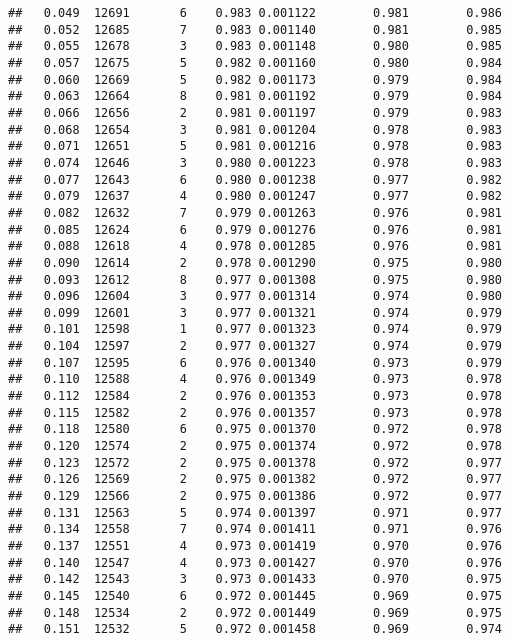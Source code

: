 \documentclass[
]{book}
\begin{document}
\begin{verbatim}
##   0.049  12691       6    0.983 0.001122        0.981        0.986
##   0.052  12685       7    0.983 0.001140        0.981        0.985
##   0.055  12678       3    0.983 0.001148        0.980        0.985
##   0.057  12675       5    0.982 0.001160        0.980        0.984
##   0.060  12669       5    0.982 0.001173        0.979        0.984
##   0.063  12664       8    0.981 0.001192        0.979        0.984
##   0.066  12656       2    0.981 0.001197        0.979        0.983
##   0.068  12654       3    0.981 0.001204        0.978        0.983
##   0.071  12651       5    0.981 0.001216        0.978        0.983
##   0.074  12646       3    0.980 0.001223        0.978        0.983
##   0.077  12643       6    0.980 0.001238        0.977        0.982
##   0.079  12637       4    0.980 0.001247        0.977        0.982
##   0.082  12632       7    0.979 0.001263        0.976        0.981
##   0.085  12624       6    0.979 0.001276        0.976        0.981
##   0.088  12618       4    0.978 0.001285        0.976        0.981
##   0.090  12614       2    0.978 0.001290        0.975        0.980
##   0.093  12612       8    0.977 0.001308        0.975        0.980
##   0.096  12604       3    0.977 0.001314        0.974        0.980
##   0.099  12601       3    0.977 0.001321        0.974        0.979
##   0.101  12598       1    0.977 0.001323        0.974        0.979
##   0.104  12597       2    0.977 0.001327        0.974        0.979
##   0.107  12595       6    0.976 0.001340        0.973        0.979
##   0.110  12588       4    0.976 0.001349        0.973        0.978
##   0.112  12584       2    0.976 0.001353        0.973        0.978
##   0.115  12582       2    0.976 0.001357        0.973        0.978
##   0.118  12580       6    0.975 0.001370        0.972        0.978
##   0.120  12574       2    0.975 0.001374        0.972        0.978
##   0.123  12572       2    0.975 0.001378        0.972        0.977
##   0.126  12569       2    0.975 0.001382        0.972        0.977
##   0.129  12566       2    0.975 0.001386        0.972        0.977
##   0.131  12563       5    0.974 0.001397        0.971        0.977
##   0.134  12558       7    0.974 0.001411        0.971        0.976
##   0.137  12551       4    0.973 0.001419        0.970        0.976
##   0.140  12547       4    0.973 0.001427        0.970        0.976
##   0.142  12543       3    0.973 0.001433        0.970        0.975
##   0.145  12540       6    0.972 0.001445        0.969        0.975
##   0.148  12534       2    0.972 0.001449        0.969        0.975
##   0.151  12532       5    0.972 0.001458        0.969        0.974

\end{verbatim}
\end{document}

